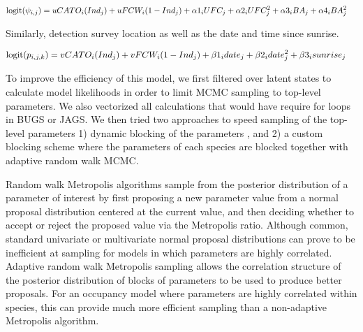 \documentclass[12pt]{article}
\begin{document}
\begin{equation}
  \begin{split}
    \label{eq:multispecies}
    \mathrm{logit}(\psi_{i,j}) &= uCATO_i(Ind_j) + uFCW_i(1-Ind_j) +
    \alpha1_iUFC_j + \alpha2_iUFC^2_j + \alpha3_iBA_j +
    \alpha4_iBA^2_j \hspace{0.2em}
  \end{split}
\end{equation}

Similarly, detection survey location as well as the date and time
since sunrise.

\begin{equation}
  \begin{split}
    \label{eq:multispecies_detection}
    \mathrm{logit}(p_{i,j,k}) &= vCATO_i(Ind_j) + vFCW_i(1-Ind_j) +
    \beta1_idate_j + \beta2_idate^2_j + \beta3_isunrise_j
    \hspace{0.2em}
  \end{split}
\end{equation}



To improve the efficiency of this model, we first filtered over latent
states to calculate model likelihoods in order to limit MCMC sampling
to top-level parameters. We also vectorized all calculations that
would have require for loops in BUGS or JAGS. We then tried two
approaches to speed sampling of the top-level parameters 1) dynamic
blocking of the parameters \citep{turek2016efficient}, and 2) a custom
blocking scheme where the parameters of each species are blocked
together with adaptive random walk MCMC.

Random walk Metropolis algorithms \citep{metropolis1953equation}
sample from the posterior distribution of a parameter of interest by
first proposing a new parameter value from a normal proposal
distribution centered at the current value, and then deciding whether
to accept or reject the proposed value via the Metropolis ratio.
Although common, standard univariate or multivariate normal proposal
distributions can prove to be inefficient at sampling for models in
which parameters are highly correlated.  Adaptive random walk
Metropolis sampling \citep{haario98anadaptive} allows the correlation
structure of the posterior distribution of blocks of parameters to be
used to produce better proposals.  For an occupancy model where
parameters are highly correlated within species, this can provide much
more efficient sampling than a non-adaptive Metropolis algorithm.
\end{document}
